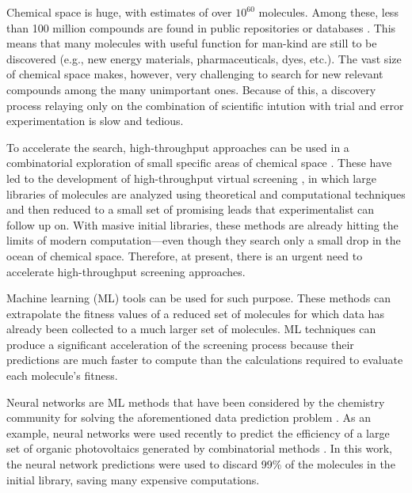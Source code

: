 Chemical space is huge, with estimates of over $10^{60}$ molecules. Among
these, less than 100 million compounds are found in public repositories or
databases \cite{reymond_enumeration_2012}. This means that many molecules with
useful function for man-kind are still to be discovered (e.g., new energy
materials, pharmaceuticals, dyes, etc.). The vast size of chemical space makes,
however, very challenging to search for new relevant compounds among the many
unimportant ones. Because of this, a discovery process relaying only on
the combination of scientific intution with trial and error experimentation is slow and tedious.

To accelerate the search, high-throughput approaches can be used in a
combinatorial exploration of small specific areas of chemical space
\cite{rajan_combinatorial_2008}. These have led to the development of
high-throughput virtual screening
\cite{pyzer-knapp_what_2015,halls_highthroughput_2010,
curtarolo_highthroughput_2013,husch_largescale_2015,subramaniam_virtual_2008,shoichet_virtual_2004,
jain_commentary_2013}, in which large libraries of molecules are analyzed using
theoretical and computational techniques and then reduced to a small set of
promising leads that experimentalist can follow up on. With masive initial libraries, these methods are already
hitting the limits of modern computation---even though they search only a small
drop in the ocean of chemical space. Therefore, at present, there is an urgent
need to accelerate high-throughput screening approaches.

Machine learning (ML) tools can be used for such purpose. These methods can
extrapolate the fitness values of a reduced set of molecules for which data has
already been collected to a much larger set of molecules.  ML techniques can
produce a significant acceleration of the screening process because their
predictions are much faster to compute than the calculations required to
evaluate each molecule's fitness.

Neural networks are ML methods that have been considered by the chemistry
community for solving the aforementioned data prediction problem
\cite{zupan_neural_1991, burden_using_1996,
rodemerck_application_2004,myint_molecular_2012,DuvMacetal15nfp}. As an example, neural networks  were used
recently to predict the efficiency of a large set of organic
photovoltaics generated by combinatorial methods
\cite{pyzer-knapp_learning_2015-1}. In this work, the neural network
predictions were used to discard 99\% of the molecules in the initial
library, saving many expensive computations.

